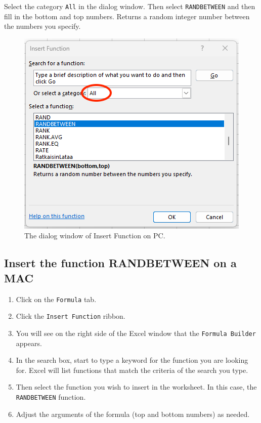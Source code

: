 \documentclass[
]{book}
\providecommand{\tightlist}{%
  \setlength{\itemsep}{0pt}\setlength{\parskip}{0pt}}
\begin{document}
Select the category \texttt{All} in the dialog window. Then select \texttt{RANDBETWEEN} and then fill in the bottom and top numbers. Returns a random integer number between the numbers you specify.

\begin{figure}

{\centering \includegraphics[width=0.6\linewidth]{images/randbetween-pc} 

}

\caption{The dialog window of Insert Function on PC.}\label{fig:irandbetween-pc}
\end{figure}

\hypertarget{insert-the-function-randbetween-on-a-mac}{%
\subsection{Insert the function RANDBETWEEN on a MAC}\label{insert-the-function-randbetween-on-a-mac}}

\begin{enumerate}
\def\labelenumi{\arabic{enumi}.}
\tightlist
\item
  Click on the \texttt{Formula} tab.
\item
  Click the \texttt{Insert\ Function} ribbon.
\item
  You will see on the right side of the Excel window that the \texttt{Formula\ Builder} appears.
\item
  In the search box, start to type a keyword for the function you are looking for. Excel will list functions that match the criteria of the search you type.
\item
  Then select the function you wish to insert in the worksheet. In this case, the \texttt{RANDBETWEEN} function.
\item
  Adjust the arguments of the formula (top and bottom numbers) as needed.
\end{enumerate}
\end{document}
